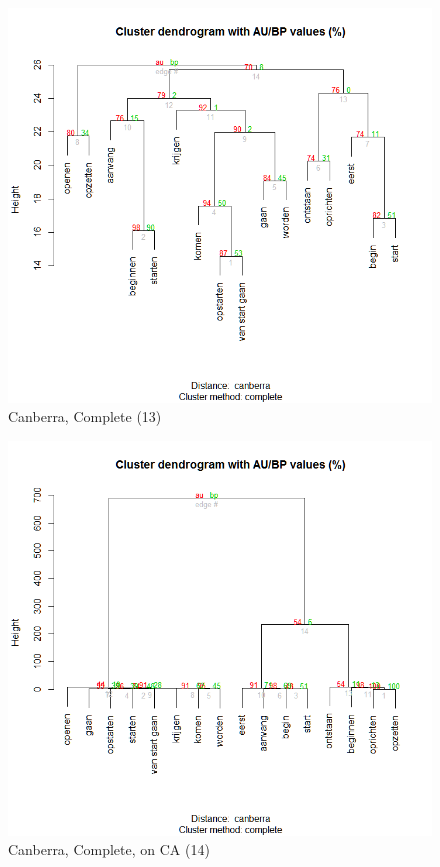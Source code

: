 \begin{figure}
\includegraphics[height=.3\textheight]{figures/Vandevoorde2-img42.png}
\caption{\label{fig:key:42}  Canberra, Complete (13)}
\end{figure}

\begin{figure}
\includegraphics[height=.3\textheight]{figures/Vandevoorde2-img43.png}
\caption{\label{fig:key:43}  Canberra, Complete, on CA (14)}
\end{figure}

